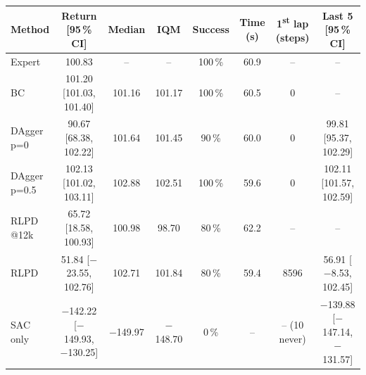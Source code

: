 \begin{tabular}{lccccccc}
\toprule
Method & Return [95\,\% CI] & Median & IQM & Success & Time (s) & 1\textsuperscript{st} lap (steps) & Last 5 [95\,\% CI] \\
\midrule
Expert & 100.83 & -- & -- & 100\,\% & 60.9 & -- & -- \\
BC & 101.20 [101.03, 101.40] & 101.16 & 101.17 & 100\,\% & 60.5 & 0 & -- \\
DAgger p=0 & 90.67 [68.38, 102.22] & 101.64 & 101.45 & 90\,\% & 60.0 & 0 & 99.81 [95.37, 102.29] \\
DAgger p=0.5 & 102.13 [101.02, 103.11] & 102.88 & 102.51 & 100\,\% & 59.6 & 0 & 102.11 [101.57, 102.59] \\
RLPD @12k & 65.72 [18.58, 100.93] & 100.98 & 98.70 & 80\,\% & 62.2 & -- & -- \\
RLPD & 51.84 [$-$23.55, 102.76] & 102.71 & 101.84 & 80\,\% & 59.4 & 8596 & 56.91 [$-$8.53, 102.45] \\
SAC only & $-$142.22 [$-$149.93, $-$130.25] & $-$149.97 & $-$148.70 & 0\,\% & -- & -- (10 never) & $-$139.88 [$-$147.14, $-$131.57] \\
\bottomrule
\end{tabular}
